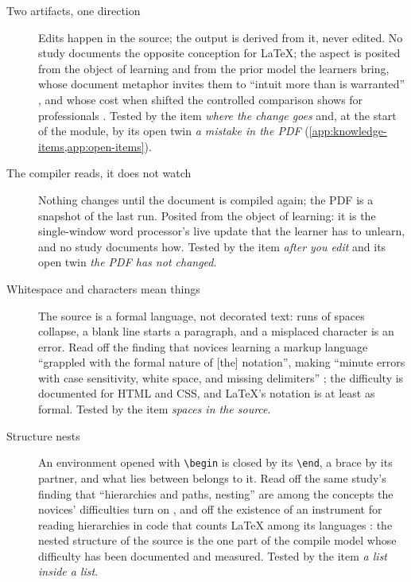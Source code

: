 \begin{description}
  \item[Two artifacts, one direction]
    Edits happen in the source; the output is derived from it, never
    edited.
    No study documents the opposite conception for LaTeX; the aspect is
    posited from the object of learning and from the prior model the
    learners bring, whose document metaphor invites them to
    \enquote{intuit more than is warranted}
    \autocite[p.~38]{Park2014openHTML}, and whose cost when shifted the
    controlled comparison shows for professionals
    \autocite{Knauff2014Latex}.
    Tested by the item \emph{where the change goes} and, at the start of
    the module, by its open twin \emph{a mistake in the PDF}
    (\cref{app:knowledge-items,app:open-items}).
  \item[The compiler reads, it does not watch]
    Nothing changes until the document is compiled again; the PDF is a
    snapshot of the last run.
    Posited from the object of learning: it is the single-window word
    processor's live update that the learner has to unlearn, and no
    study documents how.
    Tested by the item \emph{after you edit} and its open twin \emph{the
    PDF has not changed}.
  \item[Whitespace and characters mean things]
    The source is a formal language, not decorated text: runs of spaces
    collapse, a blank line starts a paragraph, and a misplaced character
    is an error.
    Read off the finding that novices learning a markup language
    \enquote{grappled with the formal nature of [the] notation}, making
    \enquote{minute errors with case sensitivity, white space, and
    missing delimiters} \autocite{Park2011WebDev}; the difficulty is
    documented for HTML and CSS, and LaTeX's notation is at least as
    formal.
    Tested by the item \emph{spaces in the source}.
  \item[Structure nests]
    An environment opened with \verb|\begin| is closed by its \verb|\end|,
    a brace by its partner, and what lies between belongs to it.
    Read off the same study's finding that \enquote{hierarchies and
    paths, nesting} are among the concepts the novices' difficulties turn
    on \autocite{Park2011WebDev}, and off the existence of an instrument
    for reading hierarchies in code that counts LaTeX among its
    languages \autocite{Park2016Hierarchies}: the nested structure of the
    source is the one part of the compile model whose difficulty has been
    documented and measured.
    Tested by the item \emph{a list inside a list}.
\end{description}

